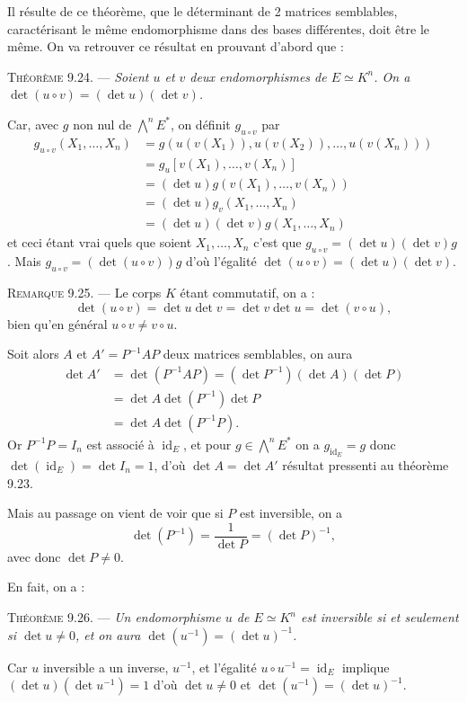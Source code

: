 Il résulte de ce théorème, que le déterminant de 2 matrices semblables, caractérisant le même endomorphisme dans des bases différentes, doit être le même. On va retrouver ce résultat en prouvant d'abord que :

\medskip\noindent\textsc{Théorème 9.24.} --- \emph{Soient $u$ et $v$ deux endomorphismes de $E\simeq K^n$. On a $\det(u\circ v)=(\det u)(\det v)$.}

Car, avec $g$ non nul de $\bigwedge^nE^*$, on définit $g_{u\circ v}$ par
\begin{align*}
g_{u\circ v}(X_1,\ldots,X_n)
&=g(u(v(X_1)),u(v(X_2)),\ldots,u(v(X_n)))\\
&=g_u[v(X_1),\ldots,v(X_n)]\\
&=(\det u)g(v(X_1),\ldots,v(X_n))\\
&=(\det u)g_v(X_1,\ldots,X_n)\\
&=(\det u)(\det v)g(X_1,\ldots,X_n)
\end{align*}
et ceci étant vrai quels que soient $X_1,\ldots,X_n$ c'est que $g_{u\circ v}=(\det u)(\det v)g$. Mais $g_{u\circ v}=(\det(u\circ v))g$ d'où l'égalité $\det(u\circ v)=(\det u)(\det v)$. \bookend

\medskip\noindent\textsc{Remarque 9.25.} --- Le corps $K$ étant commutatif, on a :
\[
\det(u\circ v)=\det u\det v=\det v\det u=\det(v\circ u),
\]
bien qu'en général $u\circ v\ne v\circ u$.

Soit alors $A$ et $A'=P^{-1}AP$ deux matrices semblables, on aura
\begin{align*}
\det A'&=\det(P^{-1}AP)=(\det P^{-1})(\det A)(\det P)\\
&=\det A\det(P^{-1})\det P\\
&=\det A\det(P^{-1}P).
\end{align*}
Or $P^{-1}P=I_n$ est associé à $\operatorname{id}_E$, et pour $g\in\bigwedge^nE^*$ on a $g_{\operatorname{id}_E}=g$ donc $\det(\operatorname{id}_E)=\det I_n=1$, d'où $\det A=\det A'$ résultat pressenti au théorème 9.23.

Mais au passage on vient de voir que si $P$ est inversible, on a
\[
\det(P^{-1})=\frac1{\det P}=(\det P)^{-1},
\]
avec donc $\det P\ne0$.

En fait, on a :

\medskip\noindent\textsc{Théorème 9.26.} --- \emph{Un endomorphisme $u$ de $E\simeq K^n$ est inversible si et seulement si $\det u\ne0$, et on aura $\det(u^{-1})=(\det u)^{-1}$.}

Car $u$ inversible a un inverse, $u^{-1}$, et l'égalité $u\circ u^{-1}=\operatorname{id}_E$ implique $(\det u)(\det u^{-1})=1$ d'où $\det u\ne0$ et $\det(u^{-1})=(\det u)^{-1}$.


